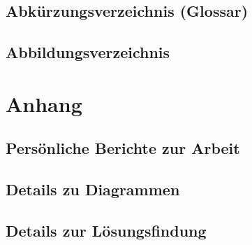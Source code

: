 \documentclass[12pt, a4paper]{report}
\begin{document}
	
	\chapter{Abkürzungsverzeichnis (Glossar)}
	\renewcommand{\glossarysection}[2][]{}
	\printglossaries
	
	
	\chapter{Abbildungsverzeichnis}
	\renewcommand{\listfigurename}{}
	\listoffigures
	
	
	\part{Anhang}
	
	
	\chapter{Persönliche Berichte zur Arbeit}
	
	\chapter{Details zu Diagrammen}
	
	\chapter{Details zur Lösungsfindung}
	
	
	
	
	
	
	
\end{document}
